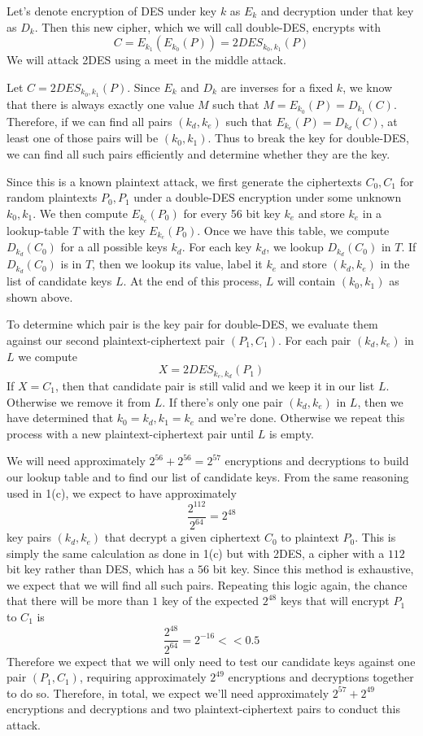 Let's denote encryption of DES under key $k$ as $E_k$ and decryption under that key as
$D_k$. Then this new cipher, which we will call double-DES, encrypts with \[C =
E_{k_1}(E_{k_0}(P)) = 2DES_{k_0,k_1}(P)\] We will attack 2DES using a meet in the middle
attack. 

Let $C = 2DES_{k_0, k_1}(P)$. Since $E_k$ and $D_k$ are inverses for a fixed $k$, we know
that there is always exactly one value $M$ such that $M = E_{k_0}(P) = D_{k_1}(C)$.
Therefore, if we can find all pairs $(k_d, k_e)$ such that $E_{k_e}(P) = D_{k_d}(C)$, at
least one of those pairs will be $(k_0, k_1)$. Thus to break the key for double-DES,
we can find all such pairs efficiently and determine whether they are the key. 

Since this is a known plaintext attack, we first generate the ciphertexts $C_0, C_1$ for
random plaintexts $P_0, P_1$ under a double-DES encryption under some unknown $k_0, k_1$.
We then compute $E_{k_e}(P_0)$ for every 56 bit key $k_e$ and store $k_e$ in a lookup-table
$T$ with the key $E_{k_e}(P_0)$. Once we have this table, we compute $D_{k_d}(C_0)$ for a
all possible keys $k_d$. For each key $k_d$, we lookup $D_{k_d}(C_0)$ in $T$. If
$D_{k_d}(C_0)$ is in $T$, then we lookup its value, label it $k_e$ and store $(k_d, k_e)$
in the list of candidate keys $L$. At the end of this process, $L$ will contain $(k_0, k_1)$ as shown above.

To determine which pair is the key pair for double-DES, we evaluate them against our
second plaintext-ciphertext pair $(P_1, C_1)$. For each pair $(k_d, k_e)$ in $L$ we compute \[X =
2DES_{k_e, k_d}(P_1)\] If $X = C_1$, then that candidate pair is still valid and we keep it in our list $L$. Otherwise we remove it from $L$. If there's only one pair $(k_d, k_e)$ in $L$, then we have determined that $k_0 = k_d, k_1 = k_e$ and we're
done. Otherwise we repeat this process with a new plaintext-ciphertext pair until $L$ is empty.

We will need approximately $2^{56} + 2^{56} = 2^{57}$ encryptions and decryptions to build our lookup
table and to find our list of candidate keys. From the same reasoning used in 1(c), we expect to have approximately \[\frac{2^{112}}{2^{64}} = 2^{48}\] key pairs $(k_d, k_e)$ that decrypt a given ciphertext $C_0$ to plaintext $P_0$. This is simply the same calculation as done in 1(c) but with 2DES, a cipher with a $112$ bit key rather than DES, which has a $56$ bit key. Since this method is exhaustive, we expect that we will find all such pairs. Repeating this logic again, the chance that there will be more than $1$ key of the expected $2^{48}$ keys that will encrypt $P_1$ to $C_1$ is \[\frac{2^{48}}{2^{64}} = 2^{-16} << 0.5\] Therefore we expect that we
will only need to test our candidate keys against one pair $(P_1, C_1)$, requiring approximately $2^{49}$ encryptions and decryptions together to do so. Therefore, in total, we expect we'll need approximately $2^{57} + 2^{49}$ encryptions and decryptions and two plaintext-ciphertext pairs to conduct this attack. 
